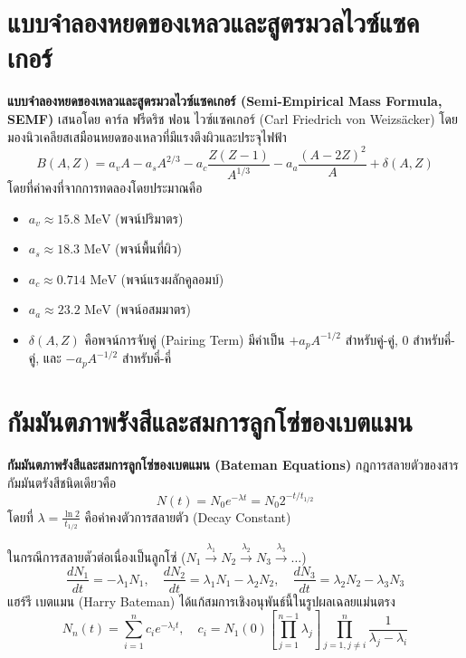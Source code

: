 \section{แบบจำลองหยดของเหลวและสูตรมวลไวซ์แซคเกอร์}

\textbf{แบบจำลองหยดของเหลวและสูตรมวลไวซ์แซคเกอร์ (Semi-Empirical Mass Formula, SEMF)} เสนอโดย คาร์ล ฟรีดริช ฟอน ไวซ์แซคเกอร์ (Carl Friedrich von Weizsäcker) โดยมองนิวเคลียสเสมือนหยดของเหลวที่มีแรงตึงผิวและประจุไฟฟ้า
\begin{equation}
B(A, Z) = a_v A - a_s A^{2/3} - a_c \frac{Z(Z-1)}{A^{1/3}} - a_a \frac{(A - 2Z)^2}{A} + \delta(A, Z)
\end{equation}
โดยที่ค่าคงที่จากการทดลองโดยประมาณคือ
\begin{itemize}
    \item $a_v \approx 15.8\text{ MeV}$ (พจน์ปริมาตร)
    \item $a_s \approx 18.3\text{ MeV}$ (พจน์พื้นที่ผิว)
    \item $a_c \approx 0.714\text{ MeV}$ (พจน์แรงผลักคูลอมบ์)
    \item $a_a \approx 23.2\text{ MeV}$ (พจน์อสมมาตร)
    \item $\delta(A, Z)$ คือพจน์การจับคู่ (Pairing Term) มีค่าเป็น $+a_p A^{-1/2}$ สำหรับคู่-คู่, $0$ สำหรับคี่-คู่, และ $-a_p A^{-1/2}$ สำหรับคี่-คี่
\end{itemize}

\section{กัมมันตภาพรังสีและสมการลูกโซ่ของเบตแมน}

\textbf{กัมมันตภาพรังสีและสมการลูกโซ่ของเบตแมน (Bateman Equations)} กฎการสลายตัวของสารกัมมันตรังสีชนิดเดียวคือ
\begin{equation}
N(t) = N_0 e^{-\lambda t} = N_0 2^{-t/t_{1/2}}
\end{equation}
โดยที่ $\lambda = \frac{\ln 2}{t_{1/2}}$ คือค่าคงตัวการสลายตัว (Decay Constant)

ในกรณีการสลายตัวต่อเนื่องเป็นลูกโซ่ ($N_1 \xrightarrow{\lambda_1} N_2 \xrightarrow{\lambda_2} N_3 \xrightarrow{\lambda_3} \dots$)
\begin{equation}
\frac{dN_1}{dt} = -\lambda_1 N_1, \quad \frac{dN_2}{dt} = \lambda_1 N_1 - \lambda_2 N_2, \quad \frac{dN_3}{dt} = \lambda_2 N_2 - \lambda_3 N_3
\end{equation}
แฮร์รี เบตแมน (Harry Bateman) ได้แก้สมการเชิงอนุพันธ์นี้ในรูปผลเฉลยแม่นตรง
\begin{equation}
N_n(t) = \sum_{i=1}^n c_i e^{-\lambda_i t}, \quad c_i = N_1(0) \left[ \prod_{j=1}^{n-1} \lambda_j \right] \prod_{j=1, j \neq i}^n \frac{1}{\lambda_j - \lambda_i}
\end{equation}

